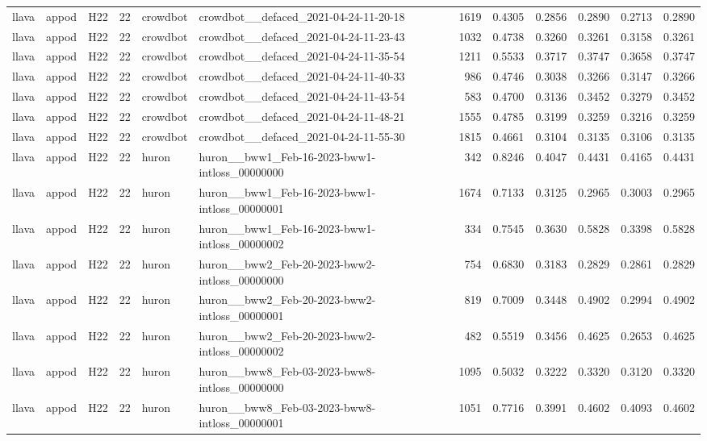 \begin{table}[tbp]
\begin{tabular}{lllrllrrrrrr}
llava & appod & H22 & 22 & crowdbot & crowdbot\_\_defaced\_2021-04-24-11-20-18 & 1619 & 0.4305 & 0.2856 & 0.2890 & 0.2713 & 0.2890 \\
llava & appod & H22 & 22 & crowdbot & crowdbot\_\_defaced\_2021-04-24-11-23-43 & 1032 & 0.4738 & 0.3260 & 0.3261 & 0.3158 & 0.3261 \\
llava & appod & H22 & 22 & crowdbot & crowdbot\_\_defaced\_2021-04-24-11-35-54 & 1211 & 0.5533 & 0.3717 & 0.3747 & 0.3658 & 0.3747 \\
llava & appod & H22 & 22 & crowdbot & crowdbot\_\_defaced\_2021-04-24-11-40-33 & 986 & 0.4746 & 0.3038 & 0.3266 & 0.3147 & 0.3266 \\
llava & appod & H22 & 22 & crowdbot & crowdbot\_\_defaced\_2021-04-24-11-43-54 & 583 & 0.4700 & 0.3136 & 0.3452 & 0.3279 & 0.3452 \\
llava & appod & H22 & 22 & crowdbot & crowdbot\_\_defaced\_2021-04-24-11-48-21 & 1555 & 0.4785 & 0.3199 & 0.3259 & 0.3216 & 0.3259 \\
llava & appod & H22 & 22 & crowdbot & crowdbot\_\_defaced\_2021-04-24-11-55-30 & 1815 & 0.4661 & 0.3104 & 0.3135 & 0.3106 & 0.3135 \\
llava & appod & H22 & 22 & huron & huron\_\_bww1\_Feb-16-2023-bww1-intloss\_00000000 & 342 & 0.8246 & 0.4047 & 0.4431 & 0.4165 & 0.4431 \\
llava & appod & H22 & 22 & huron & huron\_\_bww1\_Feb-16-2023-bww1-intloss\_00000001 & 1674 & 0.7133 & 0.3125 & 0.2965 & 0.3003 & 0.2965 \\
llava & appod & H22 & 22 & huron & huron\_\_bww1\_Feb-16-2023-bww1-intloss\_00000002 & 334 & 0.7545 & 0.3630 & 0.5828 & 0.3398 & 0.5828 \\
llava & appod & H22 & 22 & huron & huron\_\_bww2\_Feb-20-2023-bww2-intloss\_00000000 & 754 & 0.6830 & 0.3183 & 0.2829 & 0.2861 & 0.2829 \\
llava & appod & H22 & 22 & huron & huron\_\_bww2\_Feb-20-2023-bww2-intloss\_00000001 & 819 & 0.7009 & 0.3448 & 0.4902 & 0.2994 & 0.4902 \\
llava & appod & H22 & 22 & huron & huron\_\_bww2\_Feb-20-2023-bww2-intloss\_00000002 & 482 & 0.5519 & 0.3456 & 0.4625 & 0.2653 & 0.4625 \\
llava & appod & H22 & 22 & huron & huron\_\_bww8\_Feb-03-2023-bww8-intloss\_00000000 & 1095 & 0.5032 & 0.3222 & 0.3320 & 0.3120 & 0.3320 \\
llava & appod & H22 & 22 & huron & huron\_\_bww8\_Feb-03-2023-bww8-intloss\_00000001 & 1051 & 0.7716 & 0.3991 & 0.4602 & 0.4093 & 0.4602 \\

\end{tabular}
\end{table}
